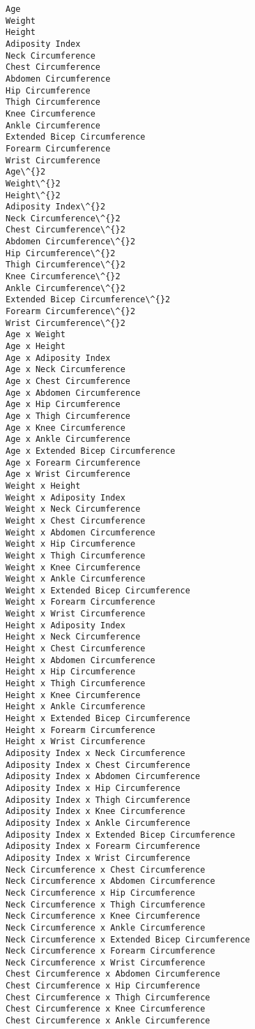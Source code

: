 \documentclass[11pt]{article}
\begin{document}
    \begin{Verbatim}[commandchars=\\\{\}]
Age
Weight
Height
Adiposity Index
Neck Circumference
Chest Circumference
Abdomen Circumference
Hip Circumference
Thigh Circumference
Knee Circumference
Ankle Circumference
Extended Bicep Circumference
Forearm Circumference
Wrist Circumference
Age\^{}2
Weight\^{}2
Height\^{}2
Adiposity Index\^{}2
Neck Circumference\^{}2
Chest Circumference\^{}2
Abdomen Circumference\^{}2
Hip Circumference\^{}2
Thigh Circumference\^{}2
Knee Circumference\^{}2
Ankle Circumference\^{}2
Extended Bicep Circumference\^{}2
Forearm Circumference\^{}2
Wrist Circumference\^{}2
Age x Weight
Age x Height
Age x Adiposity Index
Age x Neck Circumference
Age x Chest Circumference
Age x Abdomen Circumference
Age x Hip Circumference
Age x Thigh Circumference
Age x Knee Circumference
Age x Ankle Circumference
Age x Extended Bicep Circumference
Age x Forearm Circumference
Age x Wrist Circumference
Weight x Height
Weight x Adiposity Index
Weight x Neck Circumference
Weight x Chest Circumference
Weight x Abdomen Circumference
Weight x Hip Circumference
Weight x Thigh Circumference
Weight x Knee Circumference
Weight x Ankle Circumference
Weight x Extended Bicep Circumference
Weight x Forearm Circumference
Weight x Wrist Circumference
Height x Adiposity Index
Height x Neck Circumference
Height x Chest Circumference
Height x Abdomen Circumference
Height x Hip Circumference
Height x Thigh Circumference
Height x Knee Circumference
Height x Ankle Circumference
Height x Extended Bicep Circumference
Height x Forearm Circumference
Height x Wrist Circumference
Adiposity Index x Neck Circumference
Adiposity Index x Chest Circumference
Adiposity Index x Abdomen Circumference
Adiposity Index x Hip Circumference
Adiposity Index x Thigh Circumference
Adiposity Index x Knee Circumference
Adiposity Index x Ankle Circumference
Adiposity Index x Extended Bicep Circumference
Adiposity Index x Forearm Circumference
Adiposity Index x Wrist Circumference
Neck Circumference x Chest Circumference
Neck Circumference x Abdomen Circumference
Neck Circumference x Hip Circumference
Neck Circumference x Thigh Circumference
Neck Circumference x Knee Circumference
Neck Circumference x Ankle Circumference
Neck Circumference x Extended Bicep Circumference
Neck Circumference x Forearm Circumference
Neck Circumference x Wrist Circumference
Chest Circumference x Abdomen Circumference
Chest Circumference x Hip Circumference
Chest Circumference x Thigh Circumference
Chest Circumference x Knee Circumference
Chest Circumference x Ankle Circumference

\end{Verbatim}
\end{document}
